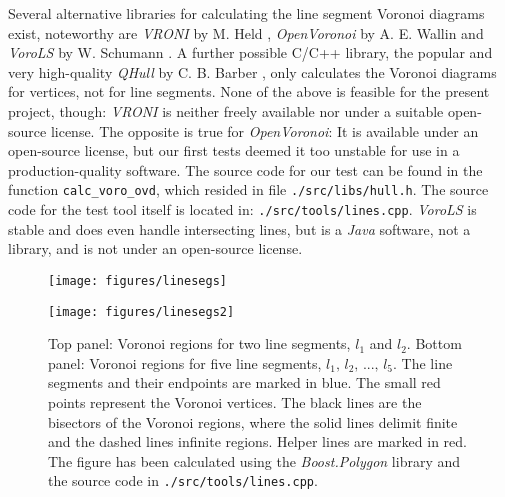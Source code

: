 Several alternative libraries for calculating the line segment Voronoi diagrams exist,
noteworthy are \textit{VRONI} by M. Held \cite{Held2001}, \textit{OpenVoronoi} by A. E. Wallin \cite{web_openvoronoi}
and \textit{VoroLS} by W. Schumann \cite{DiplomaSchumann}.
A further possible C/C++ library, the popular and very high-quality \textit{QHull} by C. B. Barber \cite{web_qhull},
only calculates the Voronoi diagrams for vertices, not for line segments.
None of the above is feasible for the present project, though: \textit{VRONI} is neither freely available nor under a
suitable open-source license.
The opposite is true for \textit{OpenVoronoi}: It is available under an open-source license, but our first tests
deemed it too unstable for use in a production-quality software. The source code for our test can be found in
the function \lstinline[language=C++]|calc_voro_ovd|, which resided in file \lstinline|./src/libs/hull.h|.
The source code for the test tool itself is located in: \lstinline|./src/tools/lines.cpp|.
\textit{VoroLS} is stable and does even handle intersecting lines, but is a \textit{Java} software, not a library, 
and is not under an open-source license.


\label{sec:voronoi}
\begin{figure*}
	\begin{minipage}{1 \textwidth}
		\begin{center}
			\texttt{[image: figures/linesegs]}
		\end{center}
		\vspace{0.25cm}
	\end{minipage}
	\begin{minipage}{1 \textwidth}
		\vspace{0.25cm}
		\begin{center}
			\texttt{[image: figures/linesegs2]}
		\end{center}
	\end{minipage}
	\caption{Top panel: Voronoi regions for two line segments, $l_1$ and $l_2$.
		Bottom panel: Voronoi regions for five line segments, $l_1,\, l_2,\, ...,\, l_5$.
		The line segments and their endpoints are marked in blue. The small red points represent the Voronoi vertices.
		The black lines are the bisectors of the Voronoi regions, where the solid lines delimit finite and the dashed lines
		infinite regions. Helper lines are marked in red. The figure has been calculated using the \textit{Boost.Polygon} library
		\cite{web_boost_polygon_voronoi} and the source code in \lstinline|./src/tools/lines.cpp|.
		\label{fig:linesegs_voro}}
\end{figure*}



